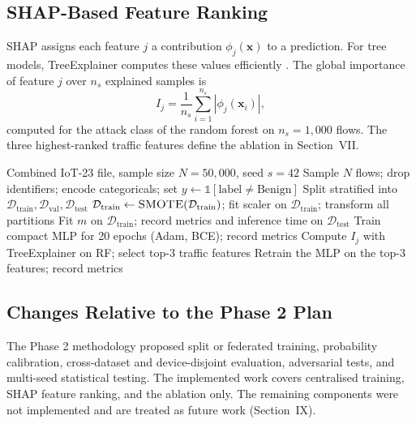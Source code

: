 \subsection{SHAP-Based Feature Ranking}
SHAP \cite{lundberg2017} assigns each feature $j$ a contribution $\phi_j(\mathbf{x})$ to a prediction. For tree models, TreeExplainer computes these values efficiently \cite{lundberg2020}. The global importance of feature $j$ over $n_s$ explained samples is
\begin{equation}
I_j=\frac{1}{n_s}\sum_{i=1}^{n_s}\left|\phi_j(\mathbf{x}_i)\right|,
\end{equation}
computed for the attack class of the random forest on $n_s=1{,}000$ flows. The three highest-ranked traffic features define the ablation in Section~VII.

\begin{algorithm}[!t]
\caption{Experimental procedure}
\label{alg:proc}
\begin{algorithmic}[1]
\Require Combined IoT-23 file, sample size $N=50{,}000$, seed $s=42$
\State Sample $N$ flows; drop identifiers; encode categoricals; set $y\leftarrow\mathbb{1}[\text{label}\neq\text{Benign}]$
\State Split stratified into $\mathcal{D}_{\text{train}},\mathcal{D}_{\text{val}},\mathcal{D}_{\text{test}}$
\State $\mathcal{D}_{\text{train}}\leftarrow\textsc{SMOTE}(\mathcal{D}_{\text{train}})$; fit scaler on $\mathcal{D}_{\text{train}}$; transform all partitions
  \State Fit $m$ on $\mathcal{D}_{\text{train}}$; record metrics and inference time on $\mathcal{D}_{\text{test}}$
\EndFor
\State Train compact MLP for 20 epochs (Adam, BCE); record metrics
\State Compute $I_j$ with TreeExplainer on RF; select top-3 traffic features
\State Retrain the MLP on the top-3 features; record metrics
\end{algorithmic}
\end{algorithm}

\subsection{Changes Relative to the Phase 2 Plan}
The Phase 2 methodology proposed split or federated training, probability calibration, cross-dataset and device-disjoint evaluation, adversarial tests, and multi-seed statistical testing. The implemented work covers centralised training, SHAP feature ranking, and the ablation only. The remaining components were not implemented and are treated as future work (Section~IX).